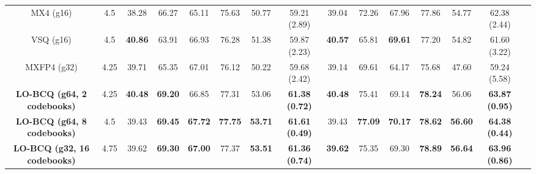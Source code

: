 \begin{table*} [!t]
\begin{center}
\begin{tabular}{|c|c||c|c|c|c|c|c||c|c|c|c|c|c|c|}
  MX4 (g16) & 4.5  &  38.28 & 66.27 & 65.11 & 75.63 & 50.77 & 59.21 (2.89) & 39.04 & 72.26 & 67.96 & 77.86 & 54.77 & 62.38 (2.44)\\ 
  VSQ (g16) & 4.5  &  \textbf{40.86} & 63.91 & 66.93 & 76.28 & 51.38 & 59.87 (2.23) & \textbf{40.57} & 65.81 & \textbf{69.61}  & 77.20 & 54.82 & 61.60 (3.22)  \\  
  MXFP4 (g32) & 4.25 & 39.71 & 65.35 & 67.01 & 76.12 & 50.22 & 59.68 (2.42) &  39.14 & 69.61 & 64.17 & 75.68 & 47.60 & 59.24 (5.58) \\  
  \rowcolor[gray]{0.9}
  \textbf{LO-BCQ (g64, 2 codebooks)} & 4.25 &  \textbf{40.48} & \textbf{69.20} & 66.85 & 77.31 & 53.06 & \textbf{61.38 (0.72)} & \textbf{40.48} & 75.41 & 69.14 & \textbf{78.24} & 56.06 & \textbf{63.87 (0.95)} \\ 
  \rowcolor[gray]{0.9}
  \textbf{LO-BCQ (g64, 8 codebooks)} & 4.5  &  39.43 & \textbf{69.45} & \textbf{67.72} & \textbf{77.75} & \textbf{53.71} & \textbf{61.61 (0.49)} & 39.43 & \textbf{77.09} & \textbf{70.17} & \textbf{78.62} & \textbf{56.60} & \textbf{64.38 (0.44)}  \\  
  \rowcolor[gray]{0.9}
  \textbf{LO-BCQ (g32, 16 codebooks) } & 4.75 &  39.62 & \textbf{69.30} & \textbf{67.00} & 77.37 & \textbf{53.51} & \textbf{61.36 (0.74)} & \textbf{39.62} & 75.35 & 69.30 & \textbf{78.89} & \textbf{56.64} & \textbf{63.96 (0.86) }\\  
\hline
\end{tabular}
\end{center}
\vspace{-1em}
\end{table*}

